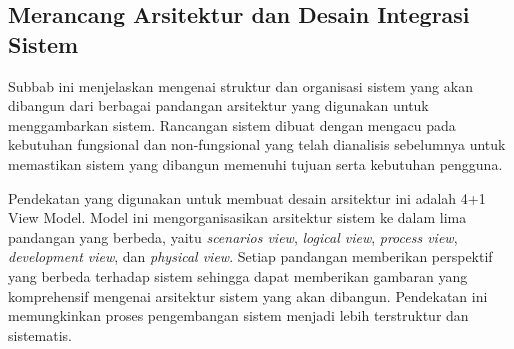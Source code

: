 \subsection{Merancang Arsitektur dan Desain Integrasi Sistem}
\label{subsec:merancang-aristektur-dan-desain-integrasi-sistem}

Subbab ini menjelaskan mengenai struktur dan organisasi sistem yang akan dibangun dari berbagai pandangan arsitektur yang digunakan untuk menggambarkan sistem. Rancangan sistem dibuat dengan mengacu pada kebutuhan fungsional dan non-fungsional yang telah 
dianalisis sebelumnya untuk memastikan sistem yang dibangun memenuhi tujuan serta kebutuhan pengguna.

Pendekatan yang digunakan untuk membuat desain arsitektur ini adalah 4+1 View Model. Model ini mengorganisasikan arsitektur sistem ke dalam lima pandangan yang berbeda, yaitu \emph{scenarios view}, \emph{logical view}, \emph{process view}, \emph{development view}, dan \emph{physical view}. Setiap pandangan memberikan perspektif yang berbeda terhadap sistem sehingga dapat memberikan gambaran yang komprehensif mengenai arsitektur sistem yang akan dibangun. Pendekatan ini memungkinkan proses pengembangan sistem menjadi lebih terstruktur dan sistematis.










